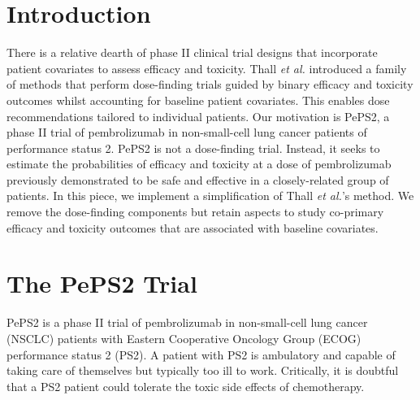 \documentclass[graybox]{svmult}
\begin{document}

\section{Introduction}
There is a relative dearth of phase II clinical trial designs that incorporate patient covariates to assess efficacy and toxicity.
Thall \textit{et al.}\cite{Thall2008} introduced a family of methods that perform dose-finding trials guided by binary efficacy and toxicity outcomes whilst accounting for baseline patient covariates.
This enables dose recommendations tailored to individual patients.
Our motivation is PePS2, a phase II trial of pembrolizumab in non-small-cell lung cancer patients of performance status 2.
PePS2 is not a dose-finding trial. 
Instead, it seeks to estimate the probabilities of efficacy and toxicity at a dose of pembrolizumab previously demonstrated to be safe and effective in a closely-related group of patients\cite{Garon2015}. 
In this piece, we implement a simplification of Thall \textit{et al.}'s method.
We remove the dose-finding components but retain aspects to study co-primary efficacy and toxicity outcomes that are associated with baseline covariates.


\section{The PePS2 Trial}
\label{s:bebop:peps2}
PePS2 is a phase II trial of pembrolizumab in non-small-cell lung cancer (NSCLC) patients with Eastern Cooperative Oncology Group (ECOG) performance status 2 (PS2).
A patient with PS2 is ambulatory and capable of taking care of themselves but typically too ill to work.
Critically, it is doubtful that a PS2 patient could tolerate the toxic side effects of chemotherapy.
\end{document}
